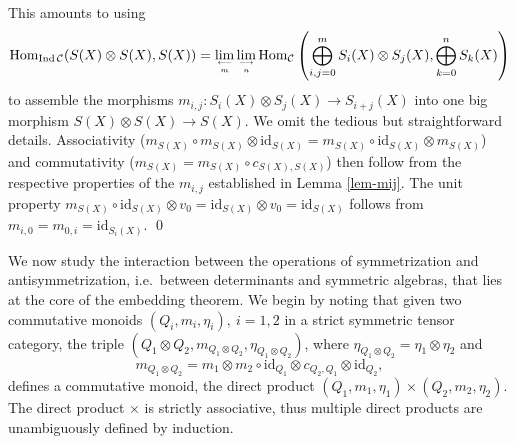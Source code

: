 \documentclass[12pt]{article}
\theoremstyle{definition}
\theoremstyle{definition}
\theoremstyle{remark}
\def\2#1{{\mathcal #1}}
\newcommand{\Hom}{\mathrm{Hom}}
\newcommand{\mcirc}{\circ}
\newcommand{\rarr}{\rightarrow}
\def\id{\mathrm{id}}
\begin{document}
\prf
This amounts to using
\[ \Hom_{\mathrm{Ind}\,\2C} (S(X)\otimes S(X),S(X))
   =\lim_{\longleftarrow\atop m}\lim_{\longrightarrow\atop n}
   \Hom_\2C\left(\bigoplus_{i,j=0}^m S_i(X)\otimes S_j(X),\bigoplus_{k=0}^n S_k(X)\right) \]
to assemble the morphisms $m_{i,j}: S_i(X)\otimes S_j(X)\rarr S_{i+j}(X)$ into one big 
morphism $S(X)\otimes S(X)\rarr S(X)$. 
We omit the tedious but straightforward details. Associativity
($m_{S(X)}\circ m_{S(X)}\otimes\id_{S(X)}=m_{S(X)}\circ\id_{S(X)}\otimes m_{S(X)}$) and
commutativity ($m_{S(X)}=m_{S(X)}\circ c_{S(X),S(X)}$) then follow  from the respective properties
of the $m_{i,j}$ established in Lemma \ref{lem-mij}. The unit property 
$m_{S(X)}\circ\id_{S(X)}\otimes v_0=\id_{S(X)}\otimes v_0=\id_{S(X)}$ follows from
$m_{i,0}=m_{0,i}=\id_{S_i(X)}$. 
\qed




We now study the interaction between the operations of symmetrization and antisymmetrization, i.e.\
between determinants and symmetric algebras, that lies at the core of the embedding theorem. We begin 
by noting that given two commutative monoids $(Q_i,m_i,\eta_i),\ i=1,2$ in a strict symmetric tensor
category, the triple $(Q_1\otimes Q_2,m_{Q_1\otimes   Q_2}, \eta_{Q_1\otimes Q_2})$, where 
$\eta_{Q_1\otimes Q_2}=\eta_1\otimes\eta_2$ and
\[ m_{Q_1\otimes Q_2}=m_1\otimes m_2\mcirc \id_{Q_1}\otimes c_{Q_2,Q_1}\otimes\id_{Q_2}, \]
defines a commutative monoid, the direct product $(Q_1,m_1,\eta_1)\times(Q_2,m_2,\eta_2)$.
The direct product $\times$ is strictly associative, thus multiple direct products are unambiguously 
defined by induction.
\end{document}
